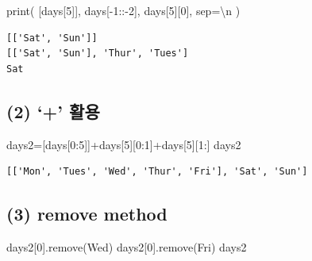 \documentclass[
  a4paper,
  DIV=11,
  numbers=noendperiod]{scrreprt}
\newenvironment{Shaded}{\begin{snugshade}}{\end{snugshade}}
\newcommand{\BuiltInTok}[1]{\textcolor[rgb]{0.00,0.23,0.31}{#1}}
\newcommand{\CharTok}[1]{\textcolor[rgb]{0.13,0.47,0.30}{#1}}
\newcommand{\DecValTok}[1]{\textcolor[rgb]{0.68,0.00,0.00}{#1}}
\newcommand{\NormalTok}[1]{\textcolor[rgb]{0.00,0.23,0.31}{#1}}
\newcommand{\OperatorTok}[1]{\textcolor[rgb]{0.37,0.37,0.37}{#1}}
\newcommand{\StringTok}[1]{\textcolor[rgb]{0.13,0.47,0.30}{#1}}
\begin{document}
\begin{Shaded}
\begin{Highlighting}[]
\BuiltInTok{print}\NormalTok{(}
\NormalTok{    [days[}\DecValTok{5}\NormalTok{]],}
\NormalTok{    days[}\OperatorTok{{-}}\DecValTok{1}\NormalTok{::}\OperatorTok{{-}}\DecValTok{2}\NormalTok{],}
\NormalTok{    days[}\DecValTok{5}\NormalTok{][}\DecValTok{0}\NormalTok{],}
\NormalTok{    sep}\OperatorTok{=}\StringTok{\textquotesingle{}}\CharTok{\textbackslash{}n}\StringTok{\textquotesingle{}}
\NormalTok{)}
\end{Highlighting}
\end{Shaded}

\begin{verbatim}
[['Sat', 'Sun']]
[['Sat', 'Sun'], 'Thur', 'Tues']
Sat
\end{verbatim}

\subsection*{(2) `+' 활용}\label{uxd65cuxc6a9}

\begin{Shaded}
\begin{Highlighting}[]
\NormalTok{days2}\OperatorTok{=}\NormalTok{[days[}\DecValTok{0}\NormalTok{:}\DecValTok{5}\NormalTok{]]}\OperatorTok{+}\NormalTok{days[}\DecValTok{5}\NormalTok{][}\DecValTok{0}\NormalTok{:}\DecValTok{1}\NormalTok{]}\OperatorTok{+}\NormalTok{days[}\DecValTok{5}\NormalTok{][}\DecValTok{1}\NormalTok{:]}
\NormalTok{days2}
\end{Highlighting}
\end{Shaded}

\begin{verbatim}
[['Mon', 'Tues', 'Wed', 'Thur', 'Fri'], 'Sat', 'Sun']
\end{verbatim}

\subsection*{(3) remove method}\label{remove-method}

\begin{Shaded}
\begin{Highlighting}[]
\NormalTok{days2[}\DecValTok{0}\NormalTok{].remove(}\StringTok{\textquotesingle{}Wed\textquotesingle{}}\NormalTok{)}
\NormalTok{days2[}\DecValTok{0}\NormalTok{].remove(}\StringTok{\textquotesingle{}Fri\textquotesingle{}}\NormalTok{)}
\NormalTok{days2}
\end{Highlighting}
\end{Shaded}
\end{document}
